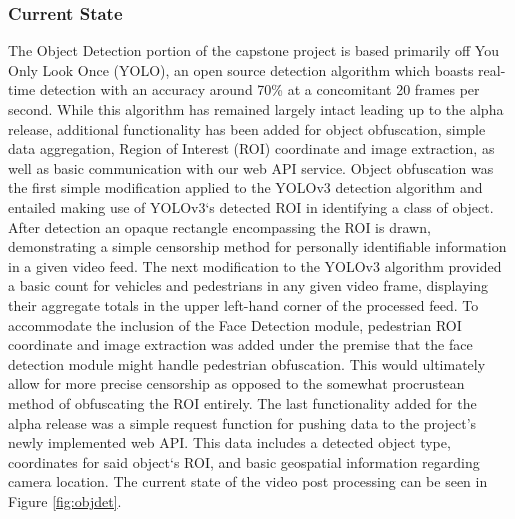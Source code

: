 \documentclass[onecolumn, draftclsnofoot,10pt, compsoc]{IEEEtran}
\begin{document}
\subsubsection{Current State}
The Object Detection portion of the capstone project is based primarily off You Only Look Once (YOLO), an open source detection algorithm which boasts real-time detection with an accuracy around 70\% at a concomitant 20 frames per second. While this algorithm has remained largely intact leading up to the alpha release, additional functionality has been added for object obfuscation, simple data aggregation, Region of Interest (ROI) coordinate and image extraction, as well as basic communication with our web API service. Object obfuscation was the first simple modification applied to the YOLOv3 detection algorithm and entailed making use of YOLOv3`s detected ROI in identifying a class of object. After detection an opaque rectangle encompassing the ROI is drawn, demonstrating a simple censorship method for personally identifiable information in a given video feed. The next modification to the YOLOv3 algorithm provided a basic count for vehicles and pedestrians in any given video frame, displaying their aggregate totals in the upper left-hand corner of the processed feed. To accommodate the inclusion of the Face Detection module, pedestrian ROI coordinate and image extraction was added under the premise that the face detection module might handle pedestrian obfuscation. This would ultimately allow for more precise censorship as opposed to the somewhat procrustean method of obfuscating the ROI entirely. The last functionality added for the alpha release was a simple request function for pushing data to the project's newly implemented web API. This data includes a detected object type, coordinates for said object`s ROI, and basic geospatial information regarding camera location. The current state of the video post processing can be seen in Figure \ref{fig:objdet}.
\end{document}

